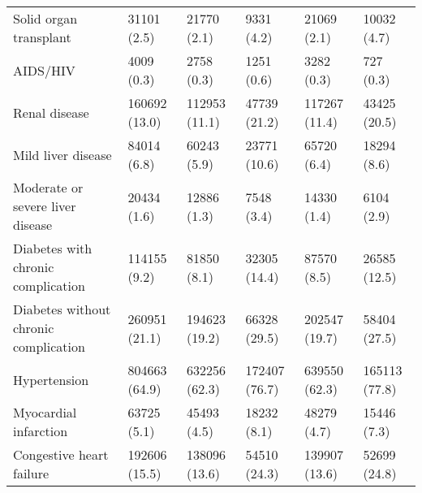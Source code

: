 \begin{adjustbox}{width={\textwidth},totalheight={\textheight},keepaspectratio,frame}
{\begin{tabular}{L{20em}C{10em}C{10em}C{10em}C{10em}C{10em}}
\hspace{3mm}     Solid organ transplant &        31101 (2.5) &                   21770 (2.1) &                9331 (4.2) &                    21069 (2.1) &               10032 (4.7) \\
\hspace{3mm}                   AIDS/HIV &         4009 (0.3) &                    2758 (0.3) &                1251 (0.6) &                     3282 (0.3) &                 727 (0.3) \\
\hspace{3mm}              Renal disease &      160692 (13.0) &                 112953 (11.1) &              47739 (21.2) &                  117267 (11.4) &              43425 (20.5) \\
\hspace{3mm}         Mild liver disease &        84014 (6.8) &                   60243 (5.9) &              23771 (10.6) &                    65720 (6.4) &               18294 (8.6) \\
\hspace{3mm}       Moderate or severe liver disease &        20434 (1.6) &                   12886 (1.3) &                7548 (3.4) &                    14330 (1.4) &                6104 (2.9) \\
\hspace{3mm}     Diabetes with chronic complication &       114155 (9.2) &                   81850 (8.1) &              32305 (14.4) &                    87570 (8.5) &              26585 (12.5) \\
\hspace{3mm}  Diabetes without chronic complication &      260951 (21.1) &                 194623 (19.2) &              66328 (29.5) &                  202547 (19.7) &              58404 (27.5) \\
\hspace{3mm}                           Hypertension &      804663 (64.9) &                 632256 (62.3) &             172407 (76.7) &                  639550 (62.3) &             165113 (77.8) \\
\hspace{3mm}                  Myocardial infarction &        63725 (5.1) &                   45493 (4.5) &               18232 (8.1) &                    48279 (4.7) &               15446 (7.3) \\
\hspace{3mm}               Congestive heart failure &      192606 (15.5) &                 138096 (13.6) &              54510 (24.3) &                  139907 (13.6) &              52699 (24.8) \\

\end{tabular}}
\end{adjustbox}
